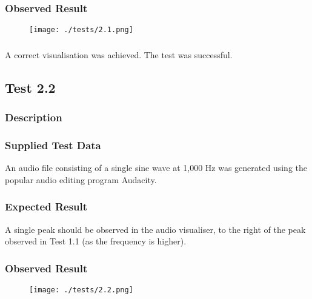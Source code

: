 \subsubsection{Observed Result}
\label{sec:evidence2.1}
\begin{figure}[H]
	\texttt{[image: ./tests/2.1.png]}
\end{figure}

\subsubsection{}
A correct visualisation was achieved. The test was successful.

\pagebreak
\subsection{Test 2.2}
\subsubsection{Description}
\paragraph{}
{
	\centering
}

\subsubsection{Supplied Test Data}
An audio file consisting of a single sine wave at 1,000 Hz was generated using the popular audio editing program Audacity.

\subsubsection{Expected Result}
A single peak should be observed in the audio visualiser, to the right of the peak observed in Test 1.1 (as the frequency is higher).

\subsubsection{Observed Result}
\label{sec:evidence2.2}
\begin{figure}[H]
	\texttt{[image: ./tests/2.2.png]}
\end{figure}

